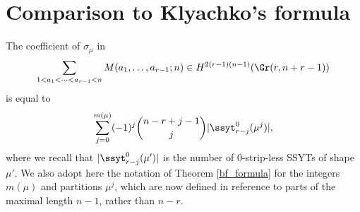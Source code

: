 \section{Comparison to Klyachko's formula}\label{klyachko_comparison_sec}

\begin{prop}\label{coeffs_fill0}
The coefficient of $\sigma_\mu$ in 
\begin{equation*}
\sum_{1<a_1<\cdots<a_{r-1}<n}M(a_1,\ldots,a_{r-1};n)\in H^{2(r-1)(n-1)}(\Gr(r,n+r-1))
\end{equation*}
is equal to 
\begin{equation*}
\sum_{j=0}^{m(\mu)}(-1)^j\binom{n-r+j-1}{j}|\ssyt^0_{r-j}(\mu^j)|,
\end{equation*}
where we recall that $|\ssyt^0_{r-j}(\mu')|$ is the number of 0-strip-less SSYTs of shape $\mu'$. We also adopt here the notation of Theorem \ref{bf_formula} for the integers $m(\mu)$ and partitions $\mu^j$, which are now defined in reference to parts of the maximal length $n-1$, rather than $n-r$.
\end{prop}

